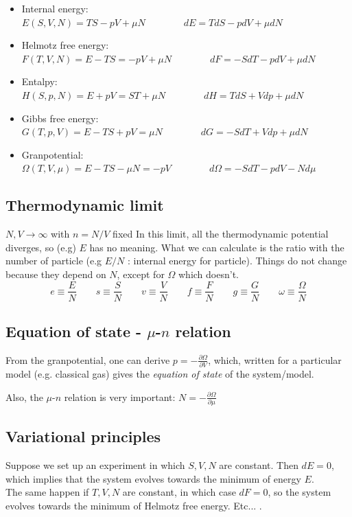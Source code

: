 \begin{itemize}
    \item Internal energy:\\
    $E(S,V,N) = TS - pV + \mu N \qquad\qquad dE = TdS - pdV + \mu dN$
    \item Helmotz free energy:\\
    $F(T,V,N) = E - TS = -pV + \mu N \qquad\qquad dF = -SdT - pdV + \mu dN$
    \item Entalpy:\\
    $H(S,p,N) = E+ pV = ST + \mu N \qquad\qquad dH = TdS + Vdp + \mu dN$
    \item Gibbs free energy:\\
    $G(T,p,V) = E- TS + pV = \mu N \qquad\qquad dG = -SdT + Vdp + \mu dN$
    \item Granpotential:\\
    $\Omega(T,V,\mu) = E-TS - \mu N = -pV \qquad\qquad d\Omega = -SdT - pdV - N d\mu$
\end{itemize}

\subsection{Thermodynamic limit}
$N,V \to \infty$ \quad with $n=N/V$ fixed
In this limit, all the thermodynamic potential diverges, so (e.g) $E$ has no meaning. What we can calculate is the ratio with the number of particle (e.g $E/N$ : internal energy for particle). Things do not change because they depend on $N$, except for $\Omega$ which doesn't.
$$ e \equiv \frac EN \qquad s \equiv \frac SN \qquad v \equiv \frac VN \qquad f \equiv \frac FN \qquad g \equiv \frac GN \qquad \omega \equiv \frac \Omega N
$$

\subsection{Equation of state - \texorpdfstring{$\mu$-$n$}{mu-n} relation}
From the granpotential, one can derive $p = -\frac{\partial\Omega}{\partial V}$, which, written for a particular model (e.g. classical gas) gives the \textit{equation of state} of the system/model.

Also, the $\mu$-$n$ relation is very important: $N = -\frac{\partial\Omega}{\partial \mu}$

\subsection{Variational principles}
Suppose we set up an experiment in which $S,V,N$ are constant. Then $dE = 0$, which implies that the system evolves towards the minimum of energy $E$.\\
The same happen if $T,V,N$ are constant, in which case $dF = 0$, so the system evolves towards the minimum of Helmotz free energy. Etc... .


